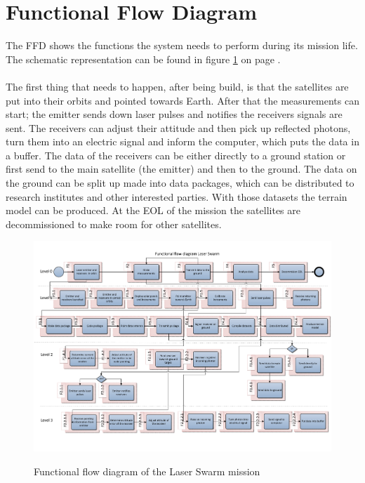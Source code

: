 \section{Functional Flow Diagram}
\label{section_FFD}
The \ac{FFD} shows the functions the system needs to perform during its mission life. The schematic representation can be found in figure \ref{pic_FFD} on page \pageref{pic_FFD}.
\\ \\
The first thing that needs to happen, after being build, is that the satellites are put into their orbits and pointed towards Earth. After that the measurements can start; the emitter sends down laser pulses and notifies the receivers signals are sent. The receivers can adjust their attitude and then pick up reflected photons, turn them into an electric signal and inform the computer, which puts the data in a buffer. The data of the receivers can be either directly to a ground station or first send to the main satellite (the emitter) and then to the ground. The data on the ground can be split up made into data packages, which can be distributed to research institutes and other interested parties. With those datasets the terrain model can be produced. At the \ac{EOL} of the mission the satellites are decommissioned to make room for other satellites.

\begin{figure}
\includegraphics[scale=0.7, angle=90]{chapters/img/pic_FFD.pdf}
\label{pic_FFD}
\caption{Functional flow diagram of the Laser Swarm mission}
\end{figure}

